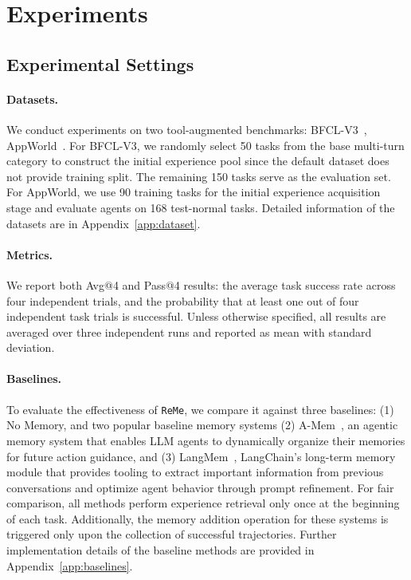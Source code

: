 \documentclass[11pt]{article}
\newcommand{\ours}{\texttt{ReMe}}
\begin{document}
\section{Experiments}
\subsection{Experimental Settings}
\paragraph{Datasets.} %
We conduct experiments on two tool-augmented benchmarks: 
BFCL-V3~\citep{patilberkeley}, AppWorld~\citep{trivedi2024appworld}. 
For BFCL-V3, we randomly select 50 tasks from the base multi-turn category to construct the initial experience pool since the default dataset does not provide training split.  
The remaining 150 tasks serve as the evaluation set. 
For AppWorld, we use 90 training tasks for the initial experience acquisition stage and evaluate agents on 168 test-normal tasks. 
Detailed information of the datasets are in Appendix~\ref{app:dataset}. 

\paragraph{Metrics.} We report both Avg@4 and Pass@4 results: the average task success rate across four independent trials, and the probability that at least one out of four independent task trials is successful. 
Unless otherwise specified, all results are averaged over three independent runs and reported as mean with standard deviation. 

\paragraph{Baselines.} 
To evaluate the effectiveness of {\ours}, we compare it against three baselines: (1) No Memory, and two popular baseline memory systems (2) A-Mem~\citep{xu2025mem}, an agentic memory system that enables LLM agents to dynamically organize their memories for future action guidance, and (3) LangMem~\citep{LangChain2025}, LangChain’s long-term memory module that provides tooling to extract important information from previous conversations and optimize agent behavior through prompt refinement. 
For fair comparison, all methods perform experience retrieval only once at the beginning of each task. Additionally, the memory addition operation for these systems is triggered only upon the collection of successful trajectories.
Further implementation details of the baseline methods are provided in Appendix~\ref{app:baselines}.
\end{document}
